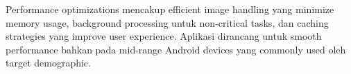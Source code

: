 Performance optimizations mencakup efficient image handling yang minimize memory usage, background processing untuk non-critical tasks, dan caching strategies yang improve user experience. Aplikasi dirancang untuk smooth performance bahkan pada mid-range Android devices yang commonly used oleh target demographic.

